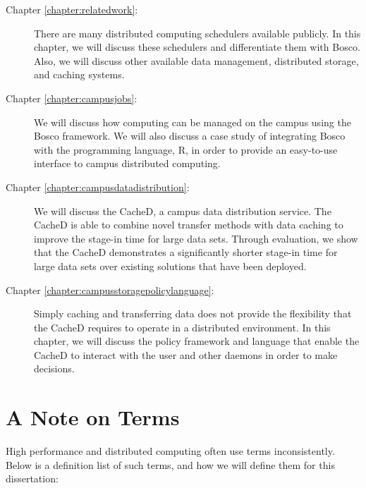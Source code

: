 \begin{description}
	\item[Chapter \ref{chapter:relatedwork}:]  There are many distributed computing schedulers available publicly.  In this chapter, we will discuss these schedulers and differentiate them with Bosco.  Also, we will discuss other available data management, distributed storage, and caching systems.
	
	\item[Chapter \ref{chapter:campusjobs}:] We will discuss how computing can be managed on the campus using the Bosco framework.  We will also discuss a case study of integrating Bosco with the programming language, R, in order to provide an easy-to-use interface to campus distributed computing.
	
	\item[Chapter \ref{chapter:campusdatadistribution}:] We will discuss the CacheD, a campus data distribution service.  The CacheD is able to combine novel transfer methods with data caching to improve the stage-in time for large data sets.  Through evaluation, we show that the CacheD demonstrates a significantly shorter stage-in time for large data sets over existing solutions that have been deployed.
	
	\item[Chapter \ref{chapter:campusstoragepolicylanguage}:]  
	Simply caching and transferring data does not provide the flexibility that the CacheD requires to operate in a distributed environment.  In this chapter, we will discuss the policy framework and language that enable the CacheD to interact with the user and other daemons in order to make decisions.
\end{description}


\newpage
\section{A Note on Terms}
High performance and distributed computing often use terms inconsistently.  Below is a definition list of such terms, and how we will define them for this dissertation:


